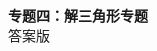 \documentclass[zihao=-4]{exam-zh}
\begin{document}
\begin{center}
  {\bfseries 专题四：解三角形专题}\\[4pt]
  { 答案版}
\end{center}

\end{document}
